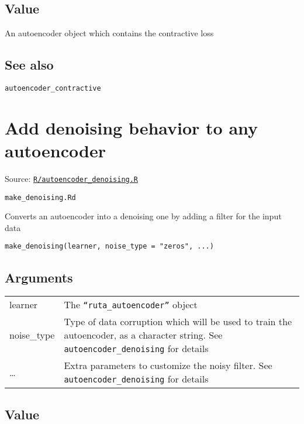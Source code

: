 \hypertarget{value}{\subsection{\texorpdfstring{\protect\hyperlink{value}{}Value}{Value}}\label{value}}

An autoencoder object which contains the contractive loss

\hypertarget{see-also}{\subsection{\texorpdfstring{\protect\hyperlink{see-also}{}See
also}{See also}}\label{see-also}}

\texttt{autoencoder\_contractive}

\section{Add denoising behavior to any
autoencoder}\label{add-denoising-behavior-to-any-autoencoder}

Source:
\href{https://github.com/fdavidcl/ruta/blob/master/R/autoencoder_denoising.R}{\texttt{R/autoencoder\_denoising.R}}

\texttt{make\_denoising.Rd}

Converts an autoencoder into a denoising one by adding a filter for the
input data

\begin{verbatim}
make_denoising(learner, noise_type = "zeros", ...)
\end{verbatim}

\hypertarget{arguments}{\subsection{\texorpdfstring{\protect\hyperlink{arguments}{}Arguments}{Arguments}}\label{arguments}}

\begin{longtable}[c]{@{}>{\small}p{3cm}>{\raggedright}p{12.5cm}@{}}
\toprule
learner & The \texttt{``ruta\_autoencoder''} object\tabularnewline
noise\_type & Type of data corruption which will be used to train the
autoencoder, as a character string. See \texttt{autoencoder\_denoising}
for details\tabularnewline
\ldots{} & Extra parameters to customize the noisy filter. See
\texttt{autoencoder\_denoising} for details\tabularnewline
\bottomrule
\end{longtable}

\hypertarget{value}{\subsection{\texorpdfstring{\protect\hyperlink{value}{}Value}{Value}}\label{value}}

